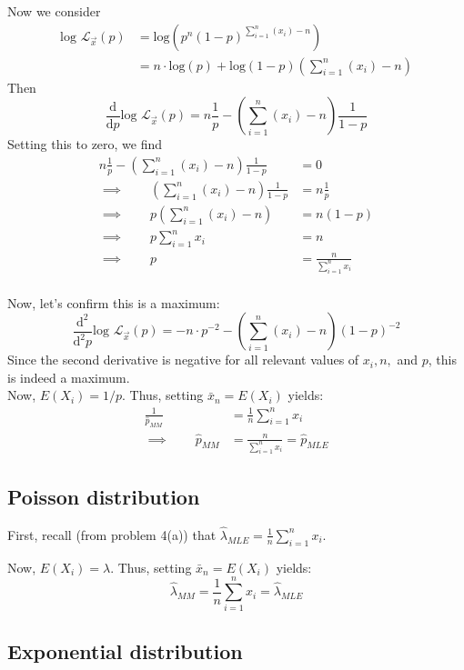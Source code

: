 \documentclass[paper=a4, fontsize=11pt]{scrartcl} %
\numberwithin{equation}{section} %
\numberwithin{figure}{section} %
\numberwithin{table}{section} %
\begin{document}
Now we consider
\begin{align*}
\textrm{log } \mathcal{L}_{\vec{x}} (p) &= \textrm{log} \left(p^n (1-p)^{\sum_{i=1}^n (x_i) -n}\right) \\
   &= n \cdot \textrm{log}(p) +\textrm{log}(1-p)\left( \sum_{i=1}^n (x_i) - n \right)
\end{align*}
Then 
\[\frac{\textrm{d}}{\textrm{d}p} \textrm{log } \mathcal{L}_{\vec{x}} (p) = n \frac{1}{p} - \left(\sum_{i=1}^n (x_i) - n\right)\frac{1}{1-p}\]
Setting this to zero, we find
\begin{align*}
n \frac{1}{p} - \left(\sum_{i=1}^n (x_i) - n\right)\frac{1}{1-p} &= 0 \\
\implies \qquad{} \left(\sum_{i=1}^n (x_i) - n\right)\frac{1}{1-p} &= n \frac{1}{p} \\ 
\implies \qquad{} p \left(\sum_{i=1}^n (x_i) - n\right) &= n (1-p) \\ 
\implies \qquad{} p \sum_{i=1}^n x_i &= n \\ 
\implies \qquad{} p &= \frac{n}{ \sum_{i=1}^n x_i} \\ 
\end{align*}

Now, let's confirm this is a maximum:
\[\frac{\textrm{d}^2}{\textrm{d}^2 p} \textrm{log } \mathcal{L}_{\vec{x}} (p) = -n \cdot p^{-2} - \left(\sum_{i=1}^n (x_i) - n\right)(1-p)^{-2}\]
Since the second derivative is negative for all relevant values of $x_i, n,$ and $p$, this is indeed a maximum. \\

Now, $E(X_i) = 1/p$. Thus, setting $\bar{x}_n = E(X_i)$ yields:
\begin{align*}
\frac{1}{\hat{p}_{MM}} &= \frac{1}{n} \sum_{i = 1}^{n}x_i \\
   \implies \qquad{} \hat{p}_{MM} &= \frac{n}{\sum_{i = 1}^{n}x_i} = \hat{p}_{MLE}
\end{align*}


\subsection{Poisson distribution}

First, recall (from problem 4(a)) that $\hat{\lambda}_{MLE} = \frac{1}{n} \sum_{i=1}^n x_i$.

Now, $E(X_i) = \lambda$. Thus, setting $\bar{x}_n = E(X_i)$ yields:
\[\hat{\lambda}_{MM} = \frac{1}{n} \sum_{i=1}^n x_i = \hat{\lambda}_{MLE}\]

\subsection{Exponential distribution}
\end{document}
